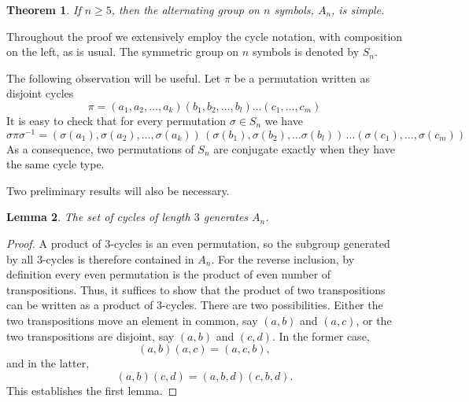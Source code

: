 \documentclass[12pt]{article}
\newtheorem{theorem}{Theorem}
\newtheorem{lemma}[theorem]{Lemma}
\begin{document}

\begin{theorem}
  If $n \geq 5$, then the alternating group
  on $n$ symbols, $A_n$, is simple.
\end{theorem}
\noindent
Throughout the proof we extensively employ the cycle notation, with
composition on the left, as is usual.  The symmetric group on $n$
symbols is denoted by $S_n$.  

The following observation will be useful.  Let $\pi$ be a permutation
written as disjoint cycles
\[
\pi = (a_1, a_2, \ldots, a_k)(b_1, b_2, \ldots, b_l)\ldots
(c_1,\ldots, c_m)
\]
It is easy to check that for every permutation $\sigma \in S_n$ we
have
\[
\sigma \pi \sigma^{-1} = (\sigma(a_1), \sigma(a_2), \ldots, \sigma(a_k))\,
                         (\sigma(b_1),\sigma(b_2), \ldots
                         \sigma(b_l))\, \ldots (\sigma(c_1),\ldots,
                         \sigma(c_m)) 
\]
As a consequence, two permutations of $S_n$ are conjugate exactly when
they have the same cycle type.

Two preliminary results  will also be necessary.  
\begin{lemma}
The set of cycles of length $3$ generates $A_n$.
\end{lemma}
\begin{proof}
A product of $3$-cycles is an even permutation, so the subgroup generated by all $3$-cycles is therefore contained in $A_n$.  For the reverse inclusion, by definition every even permutation is the product of even number of transpositions.  Thus, it suffices to show that the product of two transpositions can be written as a product of $3$-cycles.  There are two possibilities.  Either the two transpositions move an element in common, say $(a,b)$ and $(a,c)$, or the two transpositions are disjoint, say $(a,b)$ and $(c,d)$.  In the former case,
\[
(a,b)(a,c) = (a,c,b),
\]
and in the latter,
\[
(a,b)(c,d) = (a,b,d)(c,b,d).
\]
This establishes the first lemma.
\end{proof}
\end{document}
